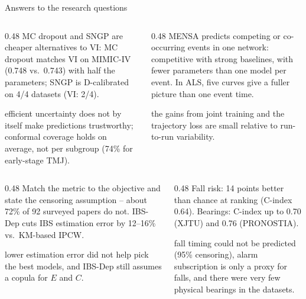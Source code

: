 
\begin{frame}{Answers to the research questions}
\footnotesize
\begin{columns}[T]
  \begin{column}{0.48\textwidth}
    MC dropout and SNGP are cheaper alternatives to VI: MC dropout matches VI on MIMIC-IV (0.748 vs.\ 0.743) with half the parameters; SNGP is D-calibrated on 4/4 datasets (VI: 2/4).\par\vspace{0.25em}
    \limit efficient uncertainty does not by itself make predictions trustworthy; conformal coverage holds on average, not per subgroup (74\% for early-stage TMJ).
  \end{column}
  \begin{column}{0.48\textwidth}
    MENSA predicts competing or co-occurring events in one network: competitive with strong baselines, with fewer parameters than one model per event. In ALS, five curves give a fuller picture than one event time.\par\vspace{0.25em}
    \limit the gains from joint training and the trajectory loss are small relative to run-to-run variability.
  \end{column}
\end{columns}
\vspace{1.2em}
\begin{columns}[T]
  \begin{column}{0.48\textwidth}
    Match the metric to the objective and state the censoring assumption -- about 72\% of 92 surveyed papers do not. IBS-Dep cuts IBS estimation error by 12--16\% vs.\ KM-based IPCW.\par\vspace{0.25em}
    \limit lower estimation error did not help pick the best models, and IBS-Dep still assumes a copula for $E$ and $C$.
  \end{column}
  \begin{column}{0.48\textwidth}
    Fall risk: 14 points better than chance at ranking (C-index 0.64). Bearings: C-index up to 0.70 (XJTU) and 0.76 (PRONOSTIA).\par\vspace{0.25em}
    \limit fall timing could not be predicted (95\% censoring), alarm subscription is only a proxy for falls, and there were very few physical bearings in the datasets.
  \end{column}
\end{columns}
\end{frame}

